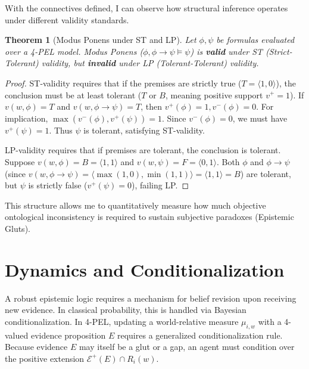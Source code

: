 \documentclass[11pt,a4paper]{article}
\newtheorem{theorem}{Theorem}[section]
\begin{document}
With the connectives defined, I can observe how structural inference operates under different validity standards.

\begin{theorem}[Modus Ponens under ST and LP]
Let $\phi, \psi$ be formulas evaluated over a 4-PEL model. Modus Ponens ($\phi, \phi \to \psi \models \psi$) is \textbf{valid} under ST (Strict-Tolerant) validity, but \textbf{invalid} under LP (Tolerant-Tolerant) validity.
\end{theorem}
\begin{proof}
ST-validity requires that if the premises are strictly true ($T = \langle 1,0 \rangle$), the conclusion must be at least tolerant ($T$ or $B$, meaning positive support $v^+ = 1$). If $v(w, \phi) = T$ and $v(w, \phi \to \psi) = T$, then $v^+(\phi)=1, v^-(\phi)=0$. For implication, $\max(v^-(\phi), v^+(\psi)) = 1$. Since $v^-(\phi)=0$, we must have $v^+(\psi)=1$. Thus $\psi$ is tolerant, satisfying ST-validity.

LP-validity requires that if premises are tolerant, the conclusion is tolerant. Suppose $v(w, \phi) = B = \langle 1,1 \rangle$ and $v(w, \psi) = F = \langle 0,1 \rangle$. Both $\phi$ and $\phi \to \psi$ (since $v(w, \phi \to \psi) = \langle \max(1,0), \min(1,1) \rangle = \langle 1,1 \rangle = B$) are tolerant, but $\psi$ is strictly false ($v^+(\psi)=0$), failing LP.
\end{proof}

This structure allows me to quantitatively measure how much objective ontological inconsistency is required to sustain subjective paradoxes (Epistemic Gluts).
\section{Dynamics and Conditionalization}
\label{sec:dynamics}

A robust epistemic logic requires a mechanism for belief revision upon receiving new evidence. In classical probability, this is handled via Bayesian conditionalization. In 4-PEL, updating a world-relative measure $\mu_{i,w}$ with a 4-valued evidence proposition $E$ requires a generalized conditionalization rule. Because evidence $E$ may itself be a glut or a gap, an agent must condition over the positive extension $\mathcal{E}^+(E) \cap R_i(w)$.
\end{document}
